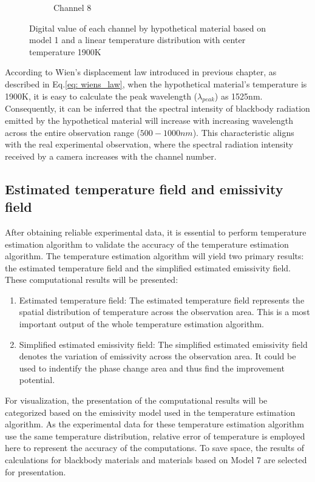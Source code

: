 \begin{figure}[htbp]
\begin{minipage}{0.87\textwidth}
\begin{subfigure}{0.23\textwidth}
            \caption{Channel 8}
        \end{subfigure}
    \end{minipage}
    \caption{Digital value of each channel by hypothetical material based on model 1
    and a linear temperature distribution with center temperature 1900K}
    \label{fig: channel}
\end{figure}


According to Wien's displacement law introduced in previous chapter, 
as described in Eq.\ref{eq: wiens_law}, when the hypothetical material's 
temperature is 1900K, it is easy to calculate the peak 
wavelength ($\lambda_{peak}$) as 1525nm. Consequently, it can be 
inferred that the spectral intensity of blackbody radiation emitted 
by the hypothetical material will increase with increasing wavelength 
across the entire observation range ($500-1000nm$). This characteristic 
aligns with the real experimental observation, where the spectral 
radiation intensity received by a camera increases with the channel 
number.

\subsection{Estimated temperature field and emissivity field}
After obtaining reliable experimental data, it is essential to perform 
temperature estimation algorithm to validate the accuracy of the 
temperature estimation algorithm. The temperature estimation algorithm 
will yield two primary results: the estimated temperature field and the 
simplified estimated emissivity field. These computational results 
will be presented:

\begin{enumerate}
    \item Estimated temperature field: The estimated temperature field represents 
    the spatial distribution of temperature across the observation area. This is 
    a most important output of the whole temperature estimation algorithm.

    \item Simplified estimated emissivity field: The simplified estimated 
    emissivity field denotes the variation of emissivity across the 
    observation area. It could be used to indentify the phase change area 
    and thus find the improvement potential.
\end{enumerate}


For visualization, the presentation of the computational results will be categorized based on the 
emissivity model used in the temperature estimation algorithm. As the 
experimental data for these temperature estimation algorithm use the 
same temperature distribution, relative error of temperature is employed here to 
represent the accuracy of the computations. To save space, the results 
of calculations for blackbody materials and materials based on Model 7 are selected for presentation.

